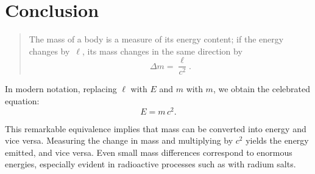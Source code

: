 \documentclass[12pt]{article}
\begin{document}
\section*{Conclusion}
\begin{quote}
The mass of a body is a measure of its energy content; if the energy changes by~$\ell$, its mass changes in the same direction by $$\Delta m = \frac{\ell}{c^2}.$$
\end{quote}
In modern notation, replacing $\ell$ with $E$ and $m$ with $m$, we obtain the celebrated equation:
\[
E = m\,c^2.
\]

This remarkable equivalence implies that mass can be converted into energy and vice versa. Measuring the change in mass and multiplying by $c^2$ yields the energy emitted, and vice versa. Even small mass differences correspond to enormous energies, especially evident in radioactive processes such as with radium salts.
\end{document}
